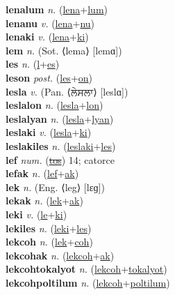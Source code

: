 \textbf{lenalum} \textit{n.} (\hyperref[lena]{lena}+\hyperref[lum]{lum})
 \label{lenalum} \\
\textbf{lenanu} \textit{v.} (\hyperref[lena]{lena}+\hyperref[nu]{nu})
 \label{lenanu} \\
\textbf{lenaki} \textit{v.} (\hyperref[lena]{lena}+\hyperref[ki]{ki})
 \label{lenaki} \\
\textbf{lem} \textit{n.} (Sot. ⟨lema⟩ [lemɑ])
 \label{lem} \\
\textbf{les} \textit{n.} (\hyperref[l]{l}+\hyperref[es]{es})
 \label{les} \\
\textbf{leson} \textit{post.} (\hyperref[les]{les}+\hyperref[on]{on})
 \label{leson} \\
\textbf{lesla} \textit{v.} (Pan. ⟨ਲੇਸਲਾ⟩ [leslɑ])
 \label{lesla} \\
\textbf{leslalon} \textit{n.} (\hyperref[lesla]{lesla}+\hyperref[lon]{lon})
 \label{leslalon} \\
\textbf{leslalyan} \textit{n.} (\hyperref[lesla]{lesla}+\hyperref[lyan]{lyan})
 \label{leslalyan} \\
\textbf{leslaki} \textit{v.} (\hyperref[lesla]{lesla}+\hyperref[ki]{ki})
 \label{leslaki} \\
\textbf{leslakiles} \textit{n.} (\hyperref[leslaki]{leslaki}+\hyperref[les]{les})
 \label{leslakiles} \\
\textbf{lef} \textit{num.} (\hyperref[tos]{\sout{tos}})
14; catorce \label{lef} \\
\textbf{lefak} \textit{n.} (\hyperref[lef]{lef}+\hyperref[ak]{ak})
 \label{lefak} \\
\textbf{lek} \textit{n.} (Eng. ⟨leg⟩ [lɛɡ])
 \label{lek} \\
\textbf{lekak} \textit{n.} (\hyperref[lek]{lek}+\hyperref[ak]{ak})
 \label{lekak} \\
\textbf{leki} \textit{v.} (\hyperref[le]{le}+\hyperref[ki]{ki})
 \label{leki} \\
\textbf{lekiles} \textit{n.} (\hyperref[leki]{leki}+\hyperref[les]{les})
 \label{lekiles} \\
\textbf{lekcoh} \textit{n.} (\hyperref[lek]{lek}+\hyperref[coh]{coh})
 \label{lekcoh} \\
\textbf{lekcohak} \textit{n.} (\hyperref[lekcoh]{lekcoh}+\hyperref[ak]{ak})
 \label{lekcohak} \\
\textbf{lekcohtokalyot} \textit{n.} (\hyperref[lekcoh]{lekcoh}+\hyperref[tokalyot]{tokalyot})
 \label{lekcohtokalyot} \\
\textbf{lekcohpoltilum} \textit{n.} (\hyperref[lekcoh]{lekcoh}+\hyperref[poltilum]{poltilum})
